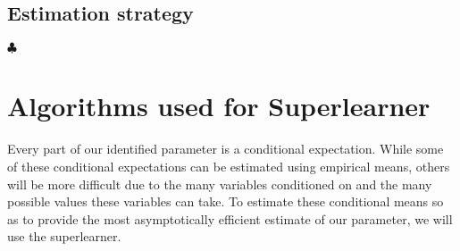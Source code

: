 \documentclass[12pt]{article}
\theoremstyle{definition}
\newcommand\independent{\protect\mathpalette{\protect\independenT}{\perp}}
\def\independenT#1#2{\mathrel{\rlap{$#1#2$}\mkern2mu{#1#2}}}
\DeclareMathOperator{\cE}{\mathbb{E}}
\newcommand{\Hopen}{V}
\begin{document}

\subsection{Estimation strategy}
$\clubsuit$

\section{Algorithms used for Superlearner}
Every part of our identified parameter is a conditional expectation.  While some of these conditional expectations can be estimated using empirical means, others will be more difficult due to the many variables conditioned on and the many possible values these variables can take. To estimate these conditional means so as to provide the most asymptotically efficient estimate of our parameter, we will use the superlearner.   
\end{document}

